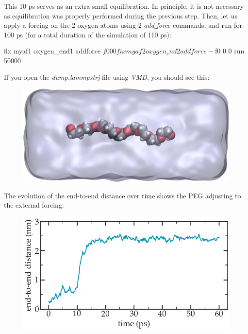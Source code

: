 \noindent This 10 ps serves as an extra small equilibration. In principle, 
it is not necessary as equilibration was properly performed during the 
previous step. Then, let us apply a forcing on the 2 oxygen atoms using 2
\textit{add$\_$force} commands, and run for 100 ps (for a total duration
of the simulation of 110 ps):

\begin{lcverbatim}
fix myaf1 oxygen_end1 addforce ${f0} 0 0
fix myaf2 oxygen_end2 addforce -${f0} 0 0
run 50000
\end{lcverbatim}

\noindent If you open the \textit{dump.lammpstrj} file using \textit{VMD}, you should
see this:

\begin{figure}
\includegraphics[width=\linewidth]{tutorials/level2/polymer-in-water/pulled_peg_light.png}
\end{figure}

The evolution of the end-to-end
distance over time shows the PEG adjusting
to the external forcing:

\begin{figure}
\includegraphics[width=\linewidth]{tutorials/level2/polymer-in-water/distance-light.png}
\end{figure}

